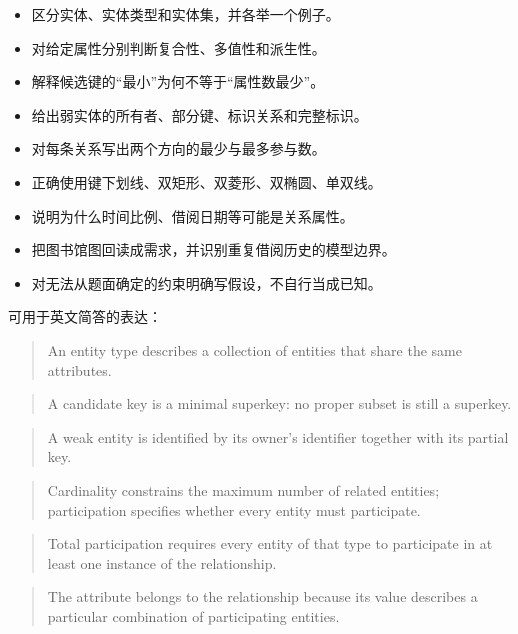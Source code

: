 \begin{itemize}
\tightlist
\item[$\square$]
  区分实体、实体类型和实体集，并各举一个例子。
\item[$\square$]
  对给定属性分别判断复合性、多值性和派生性。
\item[$\square$]
  解释候选键的``最小''为何不等于``属性数最少''。
\item[$\square$]
  给出弱实体的所有者、部分键、标识关系和完整标识。
\item[$\square$]
  对每条关系写出两个方向的最少与最多参与数。
\item[$\square$]
  正确使用键下划线、双矩形、双菱形、双椭圆、单双线。
\item[$\square$]
  说明为什么时间比例、借阅日期等可能是关系属性。
\item[$\square$]
  把图书馆图回读成需求，并识别重复借阅历史的模型边界。
\item[$\square$]
  对无法从题面确定的约束明确写假设，不自行当成已知。
\end{itemize}

可用于英文简答的表达：

\begin{quote}
An entity type describes a collection of entities that share the same attributes.
\end{quote}

\begin{quote}
A candidate key is a minimal superkey: no proper subset is still a superkey.
\end{quote}

\begin{quote}
A weak entity is identified by its owner's identifier together with its partial key.
\end{quote}

\begin{quote}
Cardinality constrains the maximum number of related entities; participation specifies whether every entity must participate.
\end{quote}

\begin{quote}
Total participation requires every entity of that type to participate in at least one instance of the relationship.
\end{quote}

\begin{quote}
The attribute belongs to the relationship because its value describes a particular combination of participating entities.
\end{quote}

